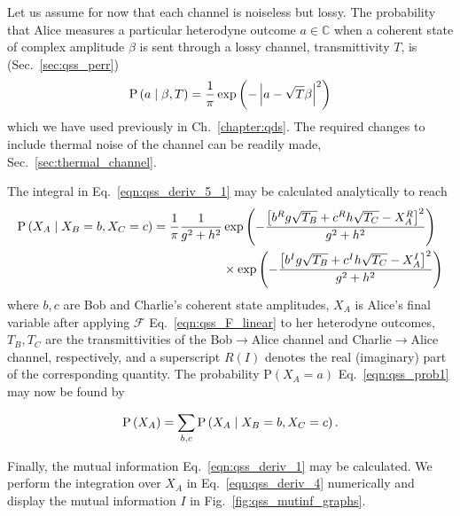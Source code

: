 Let us assume for now that each channel is noiseless but lossy. The probability that Alice measures a particular heterodyne outcome $a \in \mathbb{C}$ when a coherent state of complex amplitude $\beta$ is sent through a lossy channel, transmittivity $T$, is (Sec.~\ref{sec:qss_perr}) %
\begin{equation}\label{eqn:qss_channel_classical_prob}
\text{P}\left(a \; \middle| \; \beta, T\right) = \frac{1}{\pi}\exp\left( - \left| a - \sqrt{T}\beta \right|^2\right)
\end{equation}
which we have used previously in Ch.~\ref{chapter:qds}. The required changes to include thermal noise of the channel can be readily made, Sec.~\ref{sec:thermal_channel}.

The integral in Eq.~\ref{eqn:qss_deriv_5_1} may be calculated analytically to reach 
\begin{align}\label{eqn:qss_deriv_7}
\text{P}\left(X_A \given X_B=b, X_C=c\right) = \frac{1}{\pi} \frac{1}{g^2 + h^2} &\exp \left( - \frac{\left[b^R g \sqrt{T_B} + c^R h \sqrt{T_C} - X_A^R \right]^2}{g^2 + h^2}\right) \notag \\
%
&\times \exp \left( - \frac{\left[b^I g \sqrt{T_B} + c^I h \sqrt{T_C} - X_A^I \right]^2}{g^2 + h^2} \right)
\end{align}
where $b, c$ are Bob and Charlie's coherent state amplitudes, $X_A$ is Alice's final variable after applying $\mathcal{F}$ Eq.~\ref{eqn:qss_F_linear} to her heterodyne outcomes, $T_B, T_C$ are the transmittivities of the Bob$\rightarrow$Alice channel and Charlie$\rightarrow$Alice channel, respectively, and a superscript $R\left(I\right)$ denotes the real (imaginary) part of the corresponding quantity. %
The probability $\text{P}\left(X_A=a\right)$ Eq.~\ref{eqn:qss_prob1} may now be found by %

\begin{equation}\label{eqn:qss_deriv_pxa}
\text{P}\left(X_A\right) = \sum_{b, c} \text{P}\left(X_A \; \middle| \; X_B=b, X_C=c\right).
\end{equation}






Finally, the mutual information Eq.~\ref{eqn:qss_deriv_1} may be calculated. We perform the integration over $X_A$ in Eq.~\ref{eqn:qss_deriv_4} numerically and display the mutual information $I$ in Fig.~\ref{fig:qss_mutinf_graphs}.


